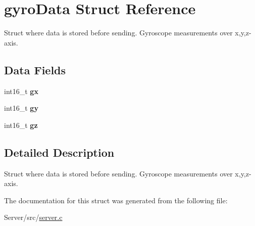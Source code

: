 \hypertarget{structgyroData}{}\section{gyro\+Data Struct Reference}
\label{structgyroData}


Struct where data is stored before sending. Gyroscope measurements over x,y,z-\/axis.  


\subsection*{Data Fields}
\begin{DoxyCompactItemize}
\item 
int16\+\_\+t {\bfseries gx}\hypertarget{structgyroData_afa64499cb58f38abcb0828a553f9008b}{}\label{structgyroData_afa64499cb58f38abcb0828a553f9008b}

\item 
int16\+\_\+t {\bfseries gy}\hypertarget{structgyroData_a81371d48ed2eac54e6dd07affadf3adc}{}\label{structgyroData_a81371d48ed2eac54e6dd07affadf3adc}

\item 
int16\+\_\+t {\bfseries gz}\hypertarget{structgyroData_a3f136b5bfe751aa589983ea667c2f324}{}\label{structgyroData_a3f136b5bfe751aa589983ea667c2f324}

\end{DoxyCompactItemize}


\subsection{Detailed Description}
Struct where data is stored before sending. Gyroscope measurements over x,y,z-\/axis. 

The documentation for this struct was generated from the following file\+:\begin{DoxyCompactItemize}
\item 
Server/src/\hyperlink{server_8c}{server.\+c}\end{DoxyCompactItemize}
